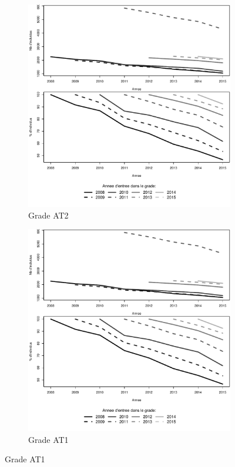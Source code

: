 \documentclass[11pt,a4paper]{article}
\begin{document}
\begin{figure}[ht] 
  \caption{Survie dans le grade: Adjoints techniques}
  \label{surv_by_entry} 
  \begin{subfigure}[b]{0.55\linewidth}
      \caption{Grade AT2} 
    \label{echelon_by_neg_0} 
    \centering
    \includegraphics[width=1\linewidth]{survival_AT_1.pdf} 
    \vspace{4ex}
  \end{subfigure}
  \begin{subfigure}[b]{0.55\linewidth}
        \caption{Grade AT1} 
    \label{echelon_by_neg_1} 
    \centering
    \includegraphics[width=1\linewidth]{survival_AT_2.pdf} 

\end{subfigure}
\end{figure}
\end{document}
